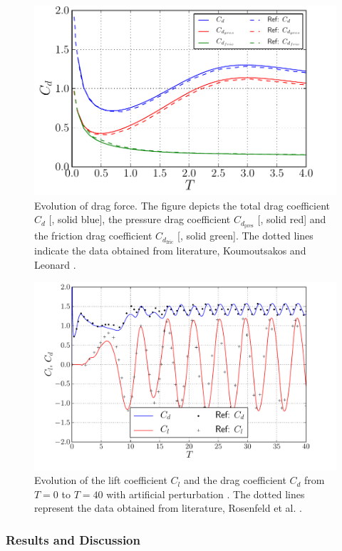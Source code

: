 	\begin{figure}[p]
	\centering
	\includegraphics[width=0.7\linewidth]{./figures/eulerian/ISC_dragEvolution2.pdf}
	\caption{Evolution of drag force. The figure depicts the total drag coefficient $C_d$ [{\color{plotBlue}{---}}, solid blue], the pressure drag coefficient $C_{d_{\mathrm{pres}}}$ [{\color{plotRed}{---}}, solid red] and the friction drag coefficient $C_{d_{\mathrm{fric}}}$ [{\color{plotGreen}{---}}, solid green]. The dotted lines indicate the data obtained from literature, Koumoutsakos and Leonard \cite{Koumoutsakos1995a}.}
	\label{fig:ISC_dragEvolution}
	\end{figure}
	
	\begin{figure}[p]
	\centering
	\includegraphics[width=0.7\linewidth]{./figures/eulerian/ISC_LongRun_dragLiftEvolution_fixed.pdf}
	\caption{Evolution of the lift coefficient $C_l$ and the drag coefficient $C_d$ from $T=0$ to $T=40$ with artificial perturbation \cite{Lecointe1984}. The dotted lines represent the data obtained from literature, Rosenfeld et al. \cite{MosheRosenFeldDochanKwak1991}.}
	\label{fig:ISC_LongRun_dragLiftEvolution}
	\end{figure}	

\subsubsection*{Results and Discussion}

